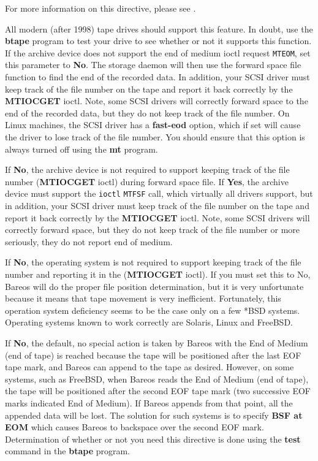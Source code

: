 \begin{description}
{For more information on this directive, please see .
}

All modern (after 1998) tape drives should support this
feature. In doubt, use the {\bf btape} program  to test your drive to see whether or not it
supports this function.
If the archive device does not support the end of medium
ioctl request {\tt MTEOM}, set this parameter to {\bf No}.
The storage daemon will then use the forward space file
function to find the end of the recorded data.
In addition, your SCSI driver must
keep track of the file number on the tape and report it back correctly by
the {\bf MTIOCGET} ioctl. Note, some SCSI drivers will correctly forward
space to the end of the recorded data, but they do not keep track of the
file number.  On Linux machines, the SCSI driver has a {\bf fast-eod}
option, which if set will cause the driver to lose track of the file
number. You should ensure that this option is always turned off using the
{\bf mt} program.

If {\bf No}, the archive device is not required to support  keeping track of
the file number ({\bf MTIOCGET} ioctl) during  forward space file. If {\bf
Yes}, the archive device must support  the {\tt ioctl} {\tt MTFSF} call, which
virtually all drivers  support, but in addition, your SCSI driver must keep
track of the  file number on the tape and report it back correctly by the
{\bf MTIOCGET} ioctl. Note, some SCSI drivers will correctly  forward space,
but they do not keep track of the file number or more  seriously, they do not
report end of medium.

If {\bf No}, the operating system is not required to support keeping track of
the file number and reporting it in the ({\bf MTIOCGET} ioctl).
If you must set this to No, Bareos will do the proper file
position determination, but it is very unfortunate because it means that
tape movement is very inefficient.
Fortunately, this operation system deficiency seems to be the case only
on a few *BSD systems.  Operating systems known to work correctly are
Solaris, Linux and FreeBSD.

If {\bf No}, the default, no special action is taken by Bareos with the End
of Medium (end of tape) is reached because the tape will be positioned after
the last EOF tape mark, and Bareos can append to the tape as desired.
However, on some systems, such as FreeBSD, when Bareos reads the End of
Medium (end of tape), the tape will be positioned after the second EOF tape
mark (two successive EOF marks indicated End of Medium). If Bareos appends
from that point, all the appended data will be lost. The solution for such
systems is to specify {\bf BSF at EOM} which causes Bareos to backspace over
the second EOF mark. Determination of whether or not you need this directive
is done using the {\bf test} command in the {\bf btape} program.


\end{description}
